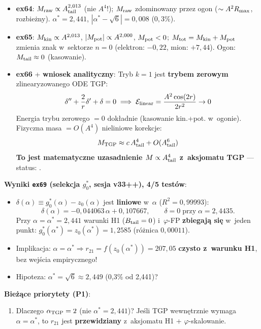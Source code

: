 \begin{remark}
\begin{itemize}[nosep]
  \item \textbf{ex64}: $M_{\rm raw} \propto A_{\rm tail}^{2{,}013}$ (nie $A^4$!);
    $M_{\rm raw}$ zdominowany przez ogon ($\sim A^2 R_{\rm max}$, rozbie\.zny).
    $\alpha^* = 2{,}441$, $|\alpha^* - \sqrt{6}| = 0{,}008$ ($0{,}3\%$).
  \item \textbf{ex65}: $M_{\rm kin} \propto A^{2{,}013}$, $|M_{\rm pot}| \propto A^{2{,}000}$,
    $M_{\rm pot} < 0$; $M_{\rm tot} = M_{\rm kin}+M_{\rm pot}$ zmienia znak w~sektorze $n=0$
    (elektron: $-0{,}22$, mion: $+7{,}44$). Ogon: $M_{\rm tail} \approx 0$ (kasowanie).
  \item \textbf{ex66} + \textbf{wniosek analityczny}:
    Tryb $k=1$ jest \textbf{trybem zerowym} zlinearyzowanego ODE TGP:
    \[
      \delta'' + \frac{2}{r}\delta' + \delta = 0
      \implies \mathcal{E}_{\rm linear} = \frac{A^2\cos(2r)}{2r^2} \to 0
    \]
    Energia trybu zerowego $= 0$ dok\l{}adnie (kasowanie kin.+pot. w~ogonie).
    Fizyczna masa $= O(A^4)$ nieliniowe korekcje:
    \[
      M_{\rm TGP} \approx c\,A_{\rm tail}^4 + O(A_{\rm tail}^6)
    \]
    \textbf{To jest matematyczne uzasadnienie $M \propto A_{\rm tail}^4$
    z~aksjomatu TGP} --- status: .
\end{itemize}
\textbf{Wyniki \texttt{ex69} (selekcja $g_0^*$, sesja v33++), 4/5 test\'ow}:
\begin{itemize}[nosep]
  \item $\delta(\alpha) \equiv g_0^*(\alpha) - z_0(\alpha)$
    jest \textbf{liniowe} w~$\alpha$ ($R^2 = 0{,}99993$):
    \[
      \delta(\alpha) = -0{,}044063\,\alpha + 0{,}107667,
      \qquad \delta = 0 \;\text{przy}\; \alpha = 2{,}4435.
    \]
    Przy $\alpha = \alpha^* = 2{,}441$ warunki H1 ($B_{\rm tail}=0$)
    i~$\varphi$-FP \textbf{zbiegaj\k{a} si\k{e}} w~jeden punkt:
    $g_0^*(\alpha^*) = z_0(\alpha^*) = 1{,}2585$ (r\'o\.znica $0{,}00011$).
  \item Implikacja: $\alpha = \alpha^* \Rightarrow r_{21} = f(z_0(\alpha^*)) = 207{,}05$
    \textbf{czysto z~warunku H1}, bez wej\'scia empirycznego!
  \item Hipoteza: $\alpha^* = \sqrt{6} \approx 2{,}449$ (0{,}3\% od 2{,}441)?
\end{itemize}
\textbf{Bie\.z\k{a}ce priorytety (P1)}:
\begin{enumerate}[nosep]
  \item Dlaczego $\alpha_{\rm TGP} = 2$ (nie $\alpha^* = 2{,}441$)?
    Je\'sli TGP wewn\k{e}trznie wymaga $\alpha = \alpha^*$, to $r_{21}$
    jest \textbf{przewidziany} z~aksjomatu H1 + $\varphi$-skalowanie.

\end{enumerate}
\end{remark}
